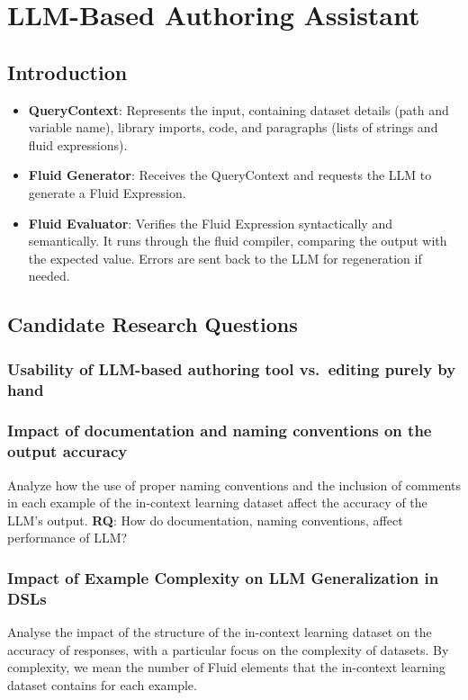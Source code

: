 \section{LLM-Based Authoring Assistant}

\subsection{Introduction}

\begin{itemize}
    \item \textbf{QueryContext}: Represents the input, containing dataset details (path and variable name), library imports, code, and paragraphs (lists of strings and fluid expressions).
    \item \textbf{Fluid Generator}: Receives the QueryContext and requests the LLM to generate a Fluid Expression.
    \item \textbf{Fluid Evaluator}: Verifies the Fluid Expression syntactically and semantically. It runs through the fluid compiler, comparing the output with the expected value. Errors are sent back to the LLM for regeneration if needed.
\end{itemize}

\subsection{Candidate Research Questions}

\subsubsection{Usability of LLM-based authoring tool vs.~editing purely by hand}

\subsubsection{Impact of documentation and naming conventions on the output accuracy}
Analyze how the use of proper naming conventions and the inclusion of comments in each example of the
in-context learning dataset affect the accuracy of the LLM's output. \textbf{RQ}: How do documentation, naming
conventions, affect performance of LLM?

\subsubsection{Impact of Example Complexity on LLM Generalization in DSLs}
Analyse the impact of the structure of the in-context learning dataset on the accuracy of responses, with a
particular focus on the complexity of datasets. By complexity, we mean the number of Fluid elements that the
in-context learning dataset contains for each example.

